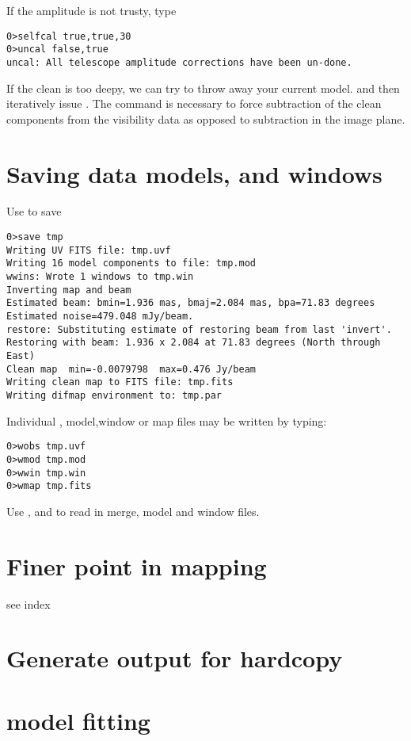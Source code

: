 \documentclass[a4paper,11pt]{article}
\begin{document}
\normalsize
\par If the amplitude is not trusty, type
\scriptsize
\begin{lstlisting}
0>selfcal true,true,30
0>uncal false,true
uncal: All telescope amplitude corrections have been un-done.
\end{lstlisting}
\normalsize
\par If the clean is too deepy, we can try  to throw away your current model. and then iteratively issue . The  command is necessary to force subtraction of the clean components from the visibility data as opposed to subtraction in the image plane.

\section{Saving data models, and windows}
\par Use  to save
\scriptsize
\begin{lstlisting}
0>save tmp
Writing UV FITS file: tmp.uvf
Writing 16 model components to file: tmp.mod
wwins: Wrote 1 windows to tmp.win
Inverting map and beam 
Estimated beam: bmin=1.936 mas, bmaj=2.084 mas, bpa=71.83 degrees
Estimated noise=479.048 mJy/beam.
restore: Substituting estimate of restoring beam from last 'invert'.
Restoring with beam: 1.936 x 2.084 at 71.83 degrees (North through East)
Clean map  min=-0.0079798  max=0.476 Jy/beam
Writing clean map to FITS file: tmp.fits
Writing difmap environment to: tmp.par
\end{lstlisting}
\normalsize
\par Individual , model,window or map files may be written by typing:
\scriptsize
\begin{lstlisting}
0>wobs tmp.uvf
0>wmod tmp.mod
0>wwin tmp.win
0>wmap tmp.fits
\end{lstlisting}
\normalsize
\par Use , and  to read in merge, model and window files.

\section{Finer point in mapping}
see index

\section{Generate output for hardcopy}

\section{model fitting}
\end{document}
